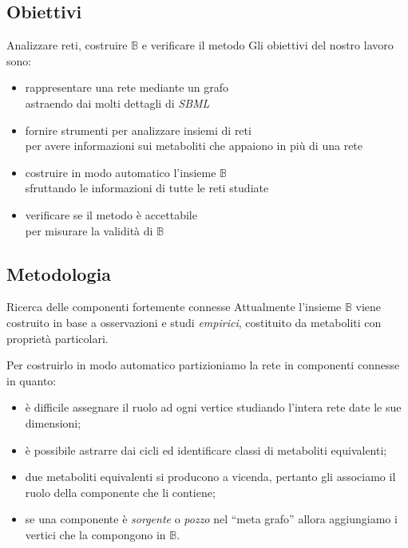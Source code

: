 \documentclass{beamer}
\begin{document}
\subsection{Obiettivi}

\begin{frame}{Analizzare reti, costruire $\mathbb{B}$ e verificare il
    metodo}
Gli obiettivi del nostro lavoro sono:
\begin{itemize}
\item<1-> rappresentare una rete mediante un grafo\\
  \footnotesize{astraendo dai molti dettagli di \emph{SBML}}
\item<2-> fornire strumenti per analizzare insiemi di reti\\
  \footnotesize{per avere informazioni sui metaboliti che appaiono in
    pi\`u di una rete}
\item<3-> costruire in modo automatico l'insieme $\mathbb{B}$\\
  \footnotesize{sfruttando le informazioni di tutte le reti studiate}
\item<4-> verificare se il metodo \`e accettabile\\
  \footnotesize{per misurare la validit\`a di $\mathbb{B}$}
\end{itemize}
\end{frame}

\subsection{Metodologia}

\begin{frame}{Ricerca delle componenti fortemente connesse}
  Attualmente l'insieme $\mathbb{B}$ viene costruito in base a
  osservazioni e studi \emph{empirici}, costituito da metaboliti con
  propriet\`a particolari.

  Per costruirlo in modo automatico partizioniamo la rete in
  componenti connesse in quanto:
\begin{itemize}
\item<2-> \`e difficile assegnare il ruolo ad ogni vertice studiando
  l'intera rete date le sue dimensioni;
\item<3-> \`e possibile astrarre dai cicli ed identificare classi di
  metaboliti equivalenti;
\item<4-> due metaboliti equivalenti si producono a vicenda, pertanto
  gli associamo il ruolo della componente che li contiene;
\item<5-> se una componente \`e \emph{sorgente} o \emph{pozzo} nel
  ``meta grafo'' allora aggiungiamo i vertici che la compongono in
  $\mathbb{B}$.
\end{itemize}
\end{frame}
\end{document}
